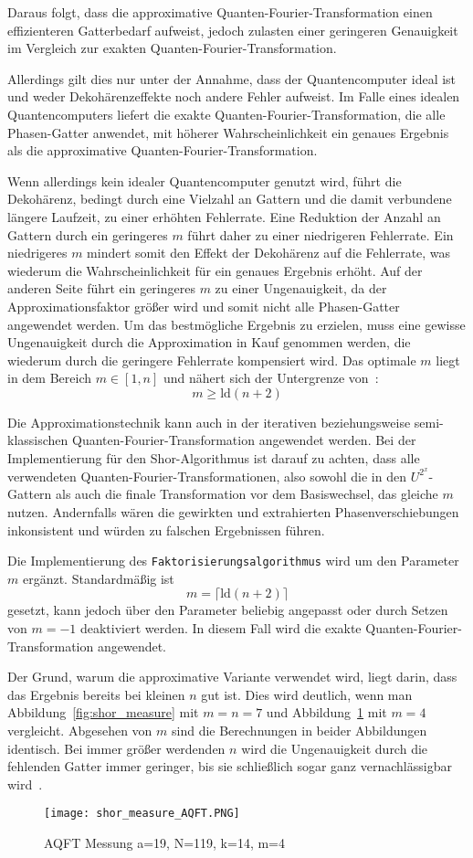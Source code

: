 Daraus folgt, dass die approximative Quanten-Fourier-Transformation einen effizienteren Gatterbedarf aufweist, 
jedoch zulasten einer geringeren Genauigkeit im Vergleich zur exakten Quanten-Fourier-Transformation.

Allerdings gilt dies nur unter der Annahme, 
dass der Quantencomputer ideal ist und weder Dekohärenzeffekte noch andere Fehler aufweist.
Im Falle eines idealen Quantencomputers liefert die exakte Quanten-Fourier-Transformation, die alle Phasen-Gatter anwendet, 
mit höherer Wahrscheinlichkeit ein genaues Ergebnis als die approximative Quanten-Fourier-Transformation.

Wenn allerdings kein idealer Quantencomputer genutzt wird, 
führt die Dekohärenz, 
bedingt durch eine Vielzahl an Gattern und die damit verbundene längere Laufzeit, 
zu einer erhöhten Fehlerrate.
Eine Reduktion der Anzahl an Gattern durch ein geringeres 
\(m\) führt daher zu einer niedrigeren Fehlerrate.
Ein niedrigeres \(m\) mindert somit den Effekt der Dekohärenz auf die Fehlerrate, 
was wiederum die Wahrscheinlichkeit für ein genaues Ergebnis erhöht.
Auf der anderen Seite führt ein geringeres \(m\) zu einer Ungenauigkeit,
da der Approximationsfaktor größer wird und somit nicht alle Phasen-Gatter angewendet werden.
Um das bestmögliche Ergebnis zu erzielen, 
muss eine gewisse Ungenauigkeit durch die Approximation in Kauf genommen werden, 
die wiederum durch die geringere Fehlerrate kompensiert wird. 
Das optimale \(m\) liegt in dem Bereich \(m \in [1,n]\) und nähert sich der Untergrenze von~\cite{Barenco_1996}:
\[m \geq \text{ld}(n+2)\]

Die Approximationstechnik kann auch in der iterativen beziehungsweise semi-klassischen Quanten-Fourier-Transformation angewendet werden. 
Bei der Implementierung für den Shor-Algorithmus ist darauf zu achten, 
dass alle verwendeten Quanten-Fourier-Transformationen, also sowohl die in den \(U^{2^x}\)-Gattern als auch die finale Transformation vor dem Basiswechsel, 
das gleiche \(m\) nutzen.
Andernfalls wären die gewirkten und extrahierten Phasenverschiebungen inkonsistent 
und würden zu falschen Ergebnissen führen.

Die Implementierung des \texttt{Faktorisierungsalgorithmus} wird um den Parameter \(m\) ergänzt.
Standardmäßig ist \[m = \lceil\text{ld}(n+2)\rceil\] gesetzt, 
kann jedoch über den Parameter beliebig angepasst oder durch Setzen von \(m=-1\) deaktiviert werden.
In diesem Fall wird die exakte Quanten-Fourier-Transformation angewendet.

Der Grund, warum die approximative Variante verwendet wird, 
liegt darin, dass das Ergebnis bereits bei kleinen \(n\) gut ist. 
Dies wird deutlich, wenn man Abbildung~\ref*{fig:shor_measure} mit \(m=n=7\) und
Abbildung~\ref*{fig:shor_measure_AQFT} mit \(m=4\) vergleicht.
Abgesehen von \(m\) sind die Berechnungen in beider Abbildungen identisch.
Bei immer größer werdenden \(n\) wird die Ungenauigkeit durch die fehlenden Gatter immer geringer,  
bis sie schließlich sogar ganz vernachlässigbar wird~\cite{cheung2004improved}.

\begin{figure} [H]
  \caption{AQFT Messung a=19, N=119, k=14, m=4}
  \label{fig:shor_measure_AQFT}
  \texttt{[image: shor\_measure\_AQFT.PNG]}
  \centering
  \end{figure}
